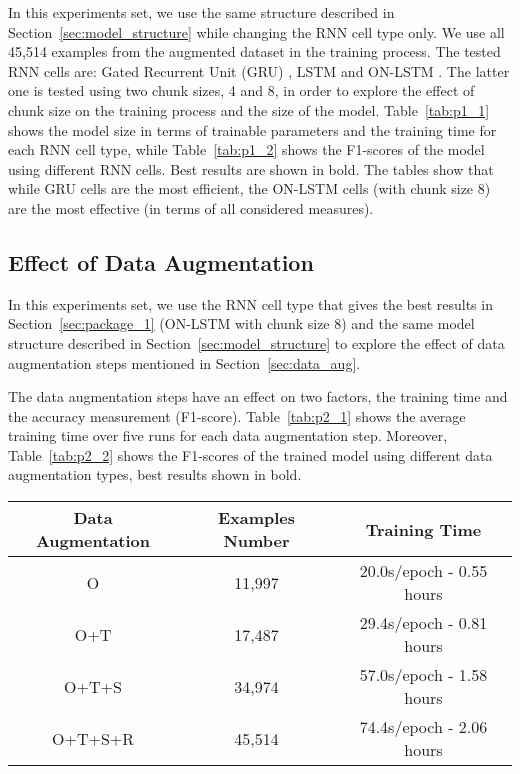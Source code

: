 \documentclass[11pt,a4paper]{article}
\begin{document}
In this experiments set, we use the same structure described in Section~\ref{sec:model_structure} while changing the RNN cell type only. We use all 45,514 examples from the augmented dataset in the training process.
The tested RNN cells are: Gated Recurrent Unit (GRU) \cite{cho2014learning}, LSTM \cite{hochreiter1997long} and ON-LSTM \cite{shen2018ordered}. The latter one is tested using two chunk sizes, 4 and 8, in order to explore the effect of chunk size on the training process and the size of the model.
Table~\ref{tab:p1_1} shows the model size in terms of trainable parameters and the training time for each RNN cell type, while Table~\ref{tab:p1_2} shows the F1-scores of the model using different RNN cells. Best results are shown in bold. The tables show that while GRU cells are the most efficient, the ON-LSTM cells (with chunk size 8) are the most effective (in terms of all considered measures).

\subsection{Effect of Data Augmentation}

In this experiments set, we use the RNN cell type that gives the best results in Section~\ref{sec:package_1} (ON-LSTM with chunk size 8) and the same model structure described in Section~\ref{sec:model_structure} to explore the effect of data augmentation steps mentioned in Section~\ref{sec:data_aug}.

The data augmentation steps have an effect on two factors, the training time and the accuracy measurement (F1-score). Table~\ref{tab:p2_1} shows the average training time over five runs for each data augmentation step.
Moreover, Table~\ref{tab:p2_2} shows the F1-scores of the trained model using different data augmentation types, best results shown in bold.

\begin{table*}
\centering
\caption{Model training time for each data augmentation step: O, T, S, and R, which stand for Original, Transitive, Symmetric, and Reflexive, respectively}
\label{tab:p2_1}
\begin{tabular}{|c|c|c|}
\hline
Data Augmentation & Examples Number & Training Time            \\ \hline
O                 & 11,997          & 20.0s/epoch - 0.55 hours \\ \hline
O+T               & 17,487          & 29.4s/epoch - 0.81 hours \\ \hline
O+T+S             & 34,974          & 57.0s/epoch - 1.58 hours \\ \hline
O+T+S+R           & 45,514          & 74.4s/epoch - 2.06 hours \\ \hline
\end{tabular}
\end{table*}
\end{document}
